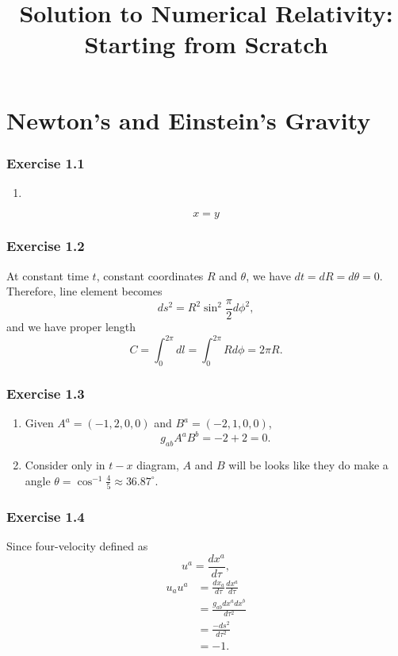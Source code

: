 \documentclass{article}
\begin{document}
\title{Solution to Numerical Relativity: Starting from Scratch}
\maketitle
\tableofcontents

\cleardoublepage

\section{Newton's and Einstein's Gravity}
\subsubsection*{Exercise 1.1}
\begin{enumerate}[label=(\alph*)]
	\item 
\end{enumerate}
\begin{equation*}
	x=y
\end{equation*}

\subsubsection*{Exercise 1.2}
At constant time $t$, constant coordinates $R$ and $\theta$, we have $dt=dR = d\theta = 0$. Therefore, line element becomes
\begin{equation}
	ds^2 = R^2 \sin^2 \frac{\pi}{2} d\phi ^2,
\end{equation}
and we have proper length
\begin{equation}
	C = \int_{0}^{2\pi}dl = \int_0^{2\pi}Rd\phi = 2\pi R.
\end{equation}

\subsubsection*{Exercise 1.3}
\begin{enumerate}[label=(\alph*)]
	\item Given $A^a = (-1, 2, 0, 0)$ and $B^a = (-2, 1, 0, 0)$,
	\begin{equation}
		g_{ab}A^a B^b = -2+2 = 0.
	\end{equation}
	\item Consider only in $t-x$ diagram, $A$ and $B$ will be looks like they do make a angle $\theta = \cos^{-1}\frac{4}{5}\approx 36.87^\circ$.
\end{enumerate}

\subsubsection*{Exercise 1.4}
Since four-velocity defined as
\begin{equation}
	u^a = \frac{dx^a}{d\tau},
\end{equation}
\begin{align}
	u_a u^a &= \frac{dx_a}{d\tau}\frac{dx^a}{d\tau}\\
	&= \frac{g_{ab}dx^adx^b}{d\tau^2}\\
	&= \frac{-ds^2}{d\tau^2}\\
	&= -1.
\end{align}
\end{document}
